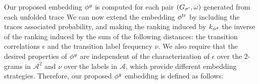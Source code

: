 {{{Our proposed embedding ${\phi^{g}}$ is computed for each pair $(G_{\sigma'},\omega)$ generated from each unfolded trace %
We can now extend the embedding ${\phi^{\text{tr}}}$ \cite{LodhiSSCW02} by including the traces associated probability, and making the ranking induced by $k_{{\phi^{g}}}$ the inverse of the ranking induced by the
sum of the following distances: the transition correlations $\epsilon$ and the transition label frequency $\nu$.}
{We also require that the desired properties of ${\phi^{g}}$ are independent of the characterization of $\epsilon$ over the $2$-grams in $\mathcal{A}^2$ and $\nu$ over the labels in $\mathcal{A}$, which  provide different embedding strategies. } Therefore, our proposed ${\phi^{g}}$ embedding is defined as follows:


}}
